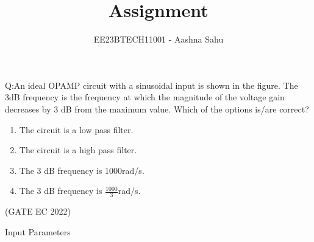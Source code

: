\documentclass[journal,12pt,twocolumn]{IEEEtran}
\theoremstyle{remark}
\begin{document}
\let\vec\mathbf



\vspace{3cm}
\title{Assignment}
\author{EE23BTECH11001 - Aashna Sahu}
\maketitle
\bigskip

\renewcommand{\thefigure}{\theenumi}
\renewcommand{\thetable}{\theenumi}

Q:An ideal OPAMP circuit with a sinusoidal input is shown in the figure. The 3dB frequency is the frequency at which the magnitude of the voltage gain decreases by 3 dB from the maximum value. Which of the options is/are correct?

\begin{figure}[H]
  \centering
  
  \label{fig:fig1}
\end{figure}



\begin{enumerate}[label=(\Alph*)]
\item The circuit is a low pass filter.\\
\item The circuit is a high pass filter.\\
\item The 3 dB frequency is 1000rad/s.\\
\item The 3 dB frequency is $\frac{1000}{3}$rad/s.\\
\end{enumerate}
\hfill(GATE EC 2022)

\solution

\begin{table}[ht]
  \centering
  
  \caption{Input Parameters}
  \label{tab:tab1}
\end{table}

\begin{figure}[H]
  \centering
  
  \label{fig:fig1}
\end{figure}
\end{document}
